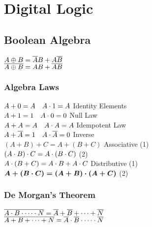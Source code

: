\section{Digital Logic}

\subsection*{Boolean Algebra}
$A\oplus B = \overline{A}B+A\overline{B}$\\
$\overline{A\oplus B} = AB+\overline{AB}$

\subsubsection*{Algebra Laws}
$A+0=A \quad A\cdot 1=A$ \hfill Identity Elements\\
$A+1=1 \quad A\cdot 0=0$ \hfill Null Law\\
$A+A=A \quad A\cdot A=A$ \hfill Idempotent Law\\
$A+\overline{A}=1 \quad A\cdot\overline{A}=0$ \hfill Inverse\\
$(A+B)+C=A+(B+C)$ \hfill Associative (1)\\
$(A\cdot B)\cdot C = A\cdot(B\cdot C)$ \hfill (2)\\
$A\cdot(B+C)=A\cdot B+A\cdot C$ \hfill Distributive (1)\\
$\boldsymbol{A+(B\cdot C)=(A+B)\cdot(A+C)}$ \hfill (2)

\subsubsection*{De Morgan's Theorem}
$\overline{A\cdot B\cdot\cdots\cdot N}=\overline{A}+\overline{B}+\cdots+\overline{N}$\\
$\overline{A+B+\cdots+N}=\overline{A}\cdot\overline{B}\cdot\cdots\cdot\overline{N}$

